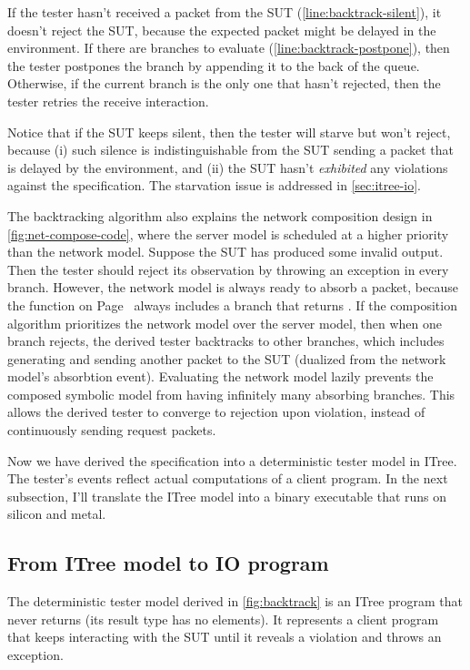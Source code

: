 \begin{enumerate}
  If the tester hasn't received a packet from the SUT
  (\autoref{line:backtrack-silent}), it doesn't reject the SUT, because the
  expected packet might be delayed in the environment.  If there are 
  branches to evaluate (\autoref{line:backtrack-postpone}), then the tester
  postpones the  branch by appending it to the back of the queue.
  Otherwise, if the current branch is the only one that hasn't rejected, then
  the tester retries the receive interaction.

  Notice that if the SUT keeps silent, then the tester will starve but won't
  reject, because (i) such silence is indistinguishable from the SUT sending a
  packet that is delayed by the environment, and (ii) the SUT hasn't {\em
  exhibited} any violations against the specification.  The starvation issue is
  addressed in \autoref{sec:itree-io}.
\end{enumerate}

The backtracking algorithm also explains the network composition design
in \autoref{fig:net-compose-code}, where the server model is scheduled at a
higher priority than the network model.  Suppose the SUT has produced some
invalid output.  Then the tester should reject its observation by throwing an
exception in every branch.  However, the network model is always ready to absorb
a packet, because the  function on Page~\pageref{def:pick-one}
always includes a branch that returns .  If the composition algorithm
prioritizes the network model over the server model, then when one branch
rejects, the derived tester backtracks to other branches, which includes
generating and sending another packet to the SUT (dualized from the network
model's absorbtion event).  Evaluating the network model lazily prevents the
composed symbolic model from having infinitely many absorbing branches.  This
allows the derived tester to converge to rejection upon violation, instead of
continuously sending request packets.  

Now we have derived the specification into a deterministic tester model in
ITree.  The tester's events reflect actual computations of a client program.  In
the next subsection, I'll translate the ITree model into a binary executable
that runs on silicon and metal.

\subsection{From ITree model to IO program}
\label{sec:itree-io}
The deterministic tester model derived in \autoref{fig:backtrack} is an ITree
program that never returns (its result type  has no elements).  It
represents a client program that keeps interacting with the SUT until it reveals
a violation and throws an exception.

